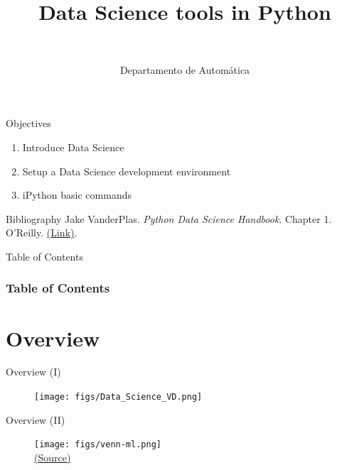 \documentclass[10pt,compress]{beamer} %
\title[Data Science tools]{Data Science tools in Python}
\author{\asignatura\\\carrera}
\institute{}
\date{Departamento de Automática}
\begin{document}
{\titlepageBlue
    \begin{frame}
        \titlepage
    \end{frame}
}

\institute{\asignatura}

\begin{frame}[plain]{}
	\begin{block}{Objectives}
		\begin{enumerate}
		\item Introduce Data Science
		\item Setup a Data Science development environment
		\item iPython basic commands
		\end{enumerate}
	\end{block}

   \begin{block}{Bibliography}
       Jake VanderPlas. \textit{Python Data Science Handbook}. Chapter 1. O'Reilly. \href{https://jakevdp.github.io/PythonDataScienceHandbook/}{(Link)}.
   \end{block}

\end{frame}

{
\begin{frame}[shrink]{Table of Contents}
 \frametitle{Table of Contents}
 \begin{multicols}{2}
 \tableofcontents
 \end{multicols}
\end{frame}
}

\section{Overview}

\begin{frame}{Overview (I)}
	\begin{figure}
		\texttt{[image: figs/Data\_Science\_VD.png]}	
	\end{figure}				
\end{frame}

\begin{frame}{Overview (II)}
	\begin{figure}
		\texttt{[image: figs/venn-ml.png]}\\
		\centering \tiny \href{https://ai6forums.nurture.ai/t/discuss-artificial-intelligence-machine-learning-deep-learning-data-science/781}{(Source)}
	\end{figure}				
\end{frame}
\end{document}
